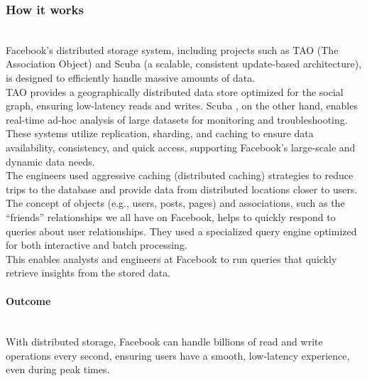\subsubsection{How it works}\label{EkVgo9QKSGqZxFnaK8tWp}
\\
Facebook's distributed storage system, including projects such as TAO (The Association Object) and Scuba (a scalable, consistent update-based architecture), is designed to efficiently handle massive amounts of data.
\\
TAO provides a geographically distributed data store optimized for the social graph, ensuring low-latency reads and writes. Scuba , on the other hand, enables real-time ad-hoc analysis of large datasets for monitoring and troubleshooting.
\\
These systems utilize replication, sharding, and caching to ensure data availability, consistency, and quick access, supporting Facebook's large-scale and dynamic data needs.
\\
The engineers used aggressive caching (distributed caching) strategies to reduce trips to the database and provide data from distributed locations closer to users.
\\
The concept of objects (e.g., users, posts, pages) and associations, such as the ``friends'' relationships we all have on Facebook, helps to quickly respond to queries about user relationships. They used a specialized query engine optimized for both interactive and batch processing.
\\
This enables analysts and engineers at Facebook to run queries that quickly retrieve insights from the stored data.
\\
\paragraph{Outcome}\label{fL7PepYhnlxUy87_GV0mU}
\\
With distributed storage, Facebook can handle billions of read and write operations every second, ensuring users have a smooth, low-latency experience, even during peak times.

